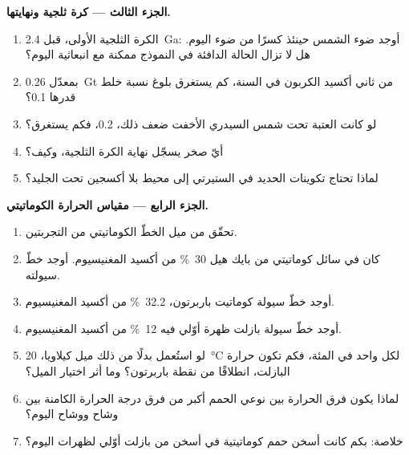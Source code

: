 \begin{problem}
\noindent\textbf{الجزء الثالث --- كرة ثلجية ونهايتها.}
\begin{enumerate}[resume]
  \item الكرة الثلجية الأولى، قبل \qty{2.4}{Ga}: أوجد ضوء الشمس حينئذ كسرًا من ضوء اليوم.
        هل لا تزال الحالة الدافئة في النموذج ممكنة مع انبعاثية اليوم؟
  \item بمعدّل \qty{0.26}{Gt} من ثاني أكسيد الكربون في السنة، كم يستغرق بلوغ نسبة خلط
        قدرها 0.1؟
  \item لو كانت العتبة تحت شمس السيدري الأخفت ضعف ذلك، 0.2، فكم يستغرق؟
  \item أيّ صخر يسجّل نهاية الكرة الثلجية، وكيف؟
  \item لماذا تحتاج تكوينات الحديد في الستيرتي إلى محيط بلا أكسجين تحت الجليد؟
\end{enumerate}

\noindent\textbf{الجزء الرابع --- مقياس الحرارة الكوماتيتي.}
\begin{enumerate}[resume]
  \item تحقّق من ميل الخطّ الكوماتيتي من التجربتين.
  \item كان في سائل كوماتيتي من بايك هيل \qty{30}{\percent} من أكسيد المغنيسيوم. أوجد خطّ سيولته.
  \item أوجد خطّ سيولة كوماتيت باربرتون، \qty{32.2}{\percent} من أكسيد المغنيسيوم.
  \item أوجد خطّ سيولة بازلت ظهرة أوّلي فيه \qty{12}{\percent} من أكسيد المغنيسيوم.
  \item لو استُعمل بدلًا من ذلك ميل كيلاويا، \qty{20}{\celsius} لكل واحد في المئة، فكم تكون حرارة
        البازلت، انطلاقًا من نقطة باربرتون؟ وما أثر اختيار الميل؟
  \item لماذا يكون فرق الحرارة بين نوعي الحمم أكبر من فرق درجة
        الحرارة الكامنة بين وشاح  ووشاح اليوم؟
  \item خلاصة: بكم كانت أسخن حمم كوماتيتية في  أسخن من بازلت أوّلي
        لظهرات اليوم؟
\end{enumerate}
\end{problem}
